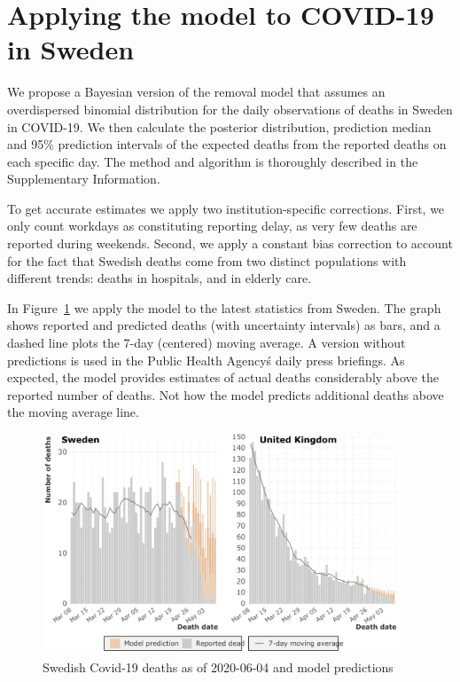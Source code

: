 \documentclass[a4paper,11pth]{article}
\begin{document}
\section{Applying the model to COVID-19 in Sweden}
We propose a Bayesian version of the removal model that assumes an overdispersed binomial distribution for the daily observations of deaths in Sweden in COVID-19. We then calculate the posterior distribution, prediction median and 95\% prediction intervals of the expected deaths from the reported deaths on each specific day. The method and algorithm is thoroughly described in the Supplementary Information.

To get accurate estimates we apply two institution-specific corrections. First, we only count workdays as constituting reporting delay, as very few deaths are reported during weekends. Second, we apply a constant bias correction to account for the fact that Swedish deaths come from two distinct populations with different trends: deaths in hospitals, and in elderly care.

In Figure~\ref{fig:latest_prediction} we apply the model to the latest statistics from Sweden. The graph shows reported and predicted deaths (with uncertainty intervals) as bars, and a dashed line plots the 7-day (centered) moving average. A version without predictions is used in the Public Health Agency\'s daily press briefings. As expected, the model provides estimates of actual deaths considerably above the reported number of deaths. Not how the model predicts additional deaths above the moving average line.

\begin{figure}
    \centering
    \includegraphics[width=0.95\textwidth]{plots/latest_prediction}
    \caption{Swedish Covid-19 deaths as of 2020-06-04 and model predictions}
    \label{fig:latest_prediction}
\end{figure}
\end{document}
